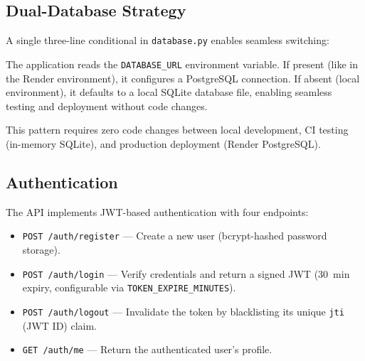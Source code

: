 \documentclass[10pt,a4paper]{article}
\begin{document}
\subsection{Dual-Database Strategy}

A single three-line conditional in \texttt{database.py} enables seamless switching:

The application reads the \texttt{DATABASE\_URL} environment variable. If present (like in the Render environment), it configures a PostgreSQL connection. If absent (local environment), it defaults to a local SQLite database file, enabling seamless testing and deployment without code changes.

This pattern requires zero code changes between local development, CI testing (in-memory SQLite), and production deployment (Render PostgreSQL).

\subsection{Authentication}

The API implements JWT-based authentication with four endpoints:

\begin{itemize}[leftmargin=1.5em]
  \item \texttt{POST /auth/register} --- Create a new user (bcrypt-hashed password storage).
  \item \texttt{POST /auth/login} --- Verify credentials and return a signed JWT (30~min expiry, configurable via \texttt{TOKEN\_EXPIRE\_MINUTES}).
  \item \texttt{POST /auth/logout} --- Invalidate the token by blacklisting its unique \texttt{jti} (JWT ID) claim.
  \item \texttt{GET /auth/me} --- Return the authenticated user's profile.
\end{itemize}
\end{document}
